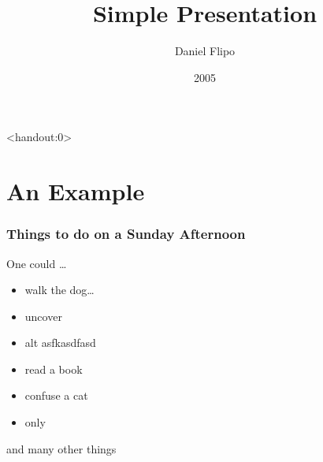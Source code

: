 \documentclass[10pt]{beamer}
\title{Simple Presentation}
\author[D. Flipo]{Daniel Flipo}
\institute{U.S.T.L. \& GUTenberg}
\date{2005}
\begin{document}
\begin{frame}<handout:0>
\titlepage
\end{frame}
\section{An Example}
\begin{frame}
\frametitle{Things to do on a Sunday Afternoon}
\begin{block}{One could \ldots}
\begin{itemize}
\item walk the dog\dots \pause
\item uncover \uncover
\item alt \alt asfkasdfasd
\item read a book\pause
\item confuse a cat\pause
\item only \only
\end{itemize}
\end{block}
and many other things
\end{frame}
\end{document}
